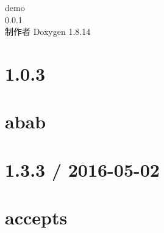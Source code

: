 \documentclass[twoside]{book}
\newcommand{\+}{\discretionary{\mbox{\scriptsize$\hookleftarrow$}}{}{}}
\newcommand{\clearemptydoublepage}{%
  \newpage{\pagestyle{empty}\cleardoublepage}%
}
\begin{document}
\hypersetup{pageanchor=false,
             bookmarksnumbered=true,
             pdfencoding=unicode
            }
\begin{titlepage}
\vspace*{7cm}
\begin{center}%
{\Large demo \\[1ex]\large 0.\+0.\+1 }\\
\vspace*{1cm}
{\large 制作者 Doxygen 1.8.14}\\
\end{center}
\end{titlepage}
\clearemptydoublepage
{}
\tableofcontents
\clearemptydoublepage
{}
\hypersetup{pageanchor=true}

\chapter{1.0.3}
\label{md__c_1_workspace_demo_src_main_script_node_modules_abab__c_h_a_n_g_e_l_o_g}

\chapter{abab}
\label{md__c_1_workspace_demo_src_main_script_node_modules_abab__r_e_a_d_m_e}

\chapter{1.3.3 / 2016-\/05-\/02}
\label{md__c_1_workspace_demo_src_main_script_node_modules_accepts__h_i_s_t_o_r_y}

\chapter{accepts}
\label{md__c_1_workspace_demo_src_main_script_node_modules_accepts__r_e_a_d_m_e}

\end{document}
